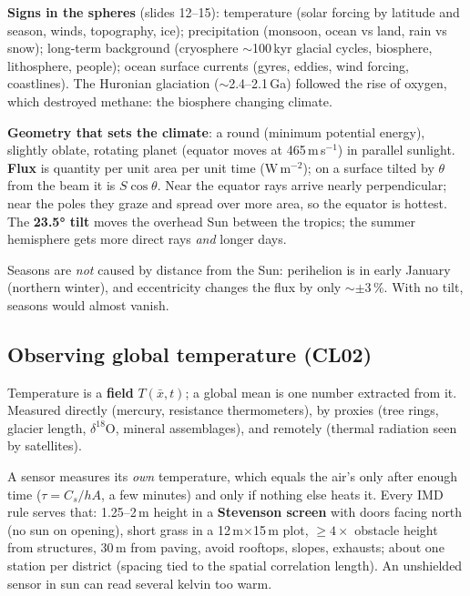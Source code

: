 \textbf{Signs in the spheres} (slides 12--15): temperature (solar forcing by latitude and season, winds, topography, ice);
precipitation (monsoon, ocean vs land, rain vs snow); long-term background (cryosphere $\sim$100\,kyr glacial cycles,
biosphere, lithosphere, people); ocean surface currents (gyres, eddies, wind forcing, coastlines). The Huronian glaciation
($\sim$2.4--2.1\,Ga) followed the rise of oxygen, which destroyed methane: the biosphere changing climate.

\textbf{Geometry that sets the climate}: a round (minimum potential energy), slightly oblate, rotating planet (equator moves
at 465\,m\,s$^{-1}$) in parallel sunlight. \textbf{Flux} is quantity per unit area per unit time (W\,m$^{-2}$); on a surface
tilted by $\theta$ from the beam it is $S\cos\theta$. Near the equator rays arrive nearly perpendicular; near the poles they
graze and spread over more area, so the equator is hottest. The \textbf{23.5° tilt} moves the overhead Sun between the
tropics; the summer hemisphere gets more direct rays \emph{and} longer days.

\begin{trap}
Seasons are \emph{not} caused by distance from the Sun: perihelion is in early January (northern winter), and eccentricity
changes the flux by only $\sim\pm3\,\%$. With no tilt, seasons would almost vanish.
\end{trap}

\subsection{Observing global temperature (CL02)}
Temperature is a \textbf{field} $T(\bar x,t)$; a global mean is one number extracted from it. Measured directly
(mercury, resistance thermometers), by proxies (tree rings, glacier length, $\delta^{18}$O, mineral assemblages), and remotely
(thermal radiation seen by satellites).

\begin{keyidea}
A sensor measures its \emph{own} temperature, which equals the air's only after enough time ($\tau=C_s/hA$, a few minutes)
and only if nothing else heats it. Every IMD rule serves that: 1.25--2\,m height in a \textbf{Stevenson screen} with
doors facing north (no sun on opening), short grass in a 12\,m$\times$15\,m plot, $\ge4\times$ obstacle height from
structures, 30\,m from paving, avoid rooftops, slopes, exhausts; about one station per district (spacing tied to the
spatial correlation length). An unshielded sensor in sun can read several kelvin too warm.
\end{keyidea}


